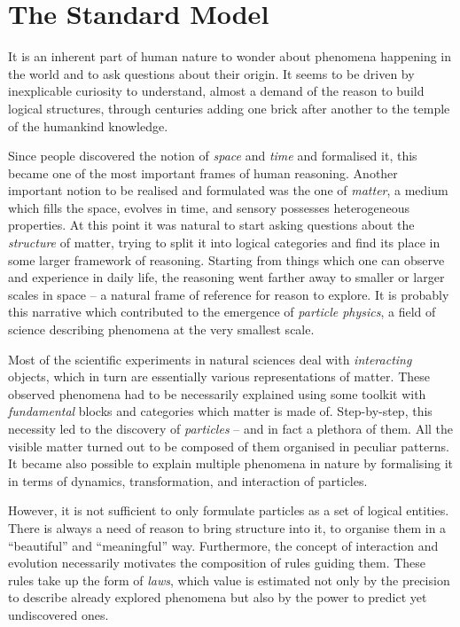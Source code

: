 \chapter{The Standard Model}\label{sec:sm}

It is an inherent part of human nature to wonder about phenomena happening in the world and to ask questions about their origin. It seems to be driven by inexplicable curiosity to understand, almost a demand of the reason to build logical structures, through centuries adding one brick after another to the temple of the humankind knowledge. 

Since people discovered the notion of \textit{space} and \textit{time} and formalised it, this became one of the most important frames of human reasoning. Another important notion to be realised and formulated was the one of \textit{matter}, a medium which fills the space, evolves in time, and sensory possesses heterogeneous properties. At this point it was natural to start asking questions about the \textit{structure} of matter, trying to split it into logical categories and find its place in some larger framework of reasoning. Starting from things which one can observe and experience in daily life, the reasoning went farther away to smaller or larger scales in space -- a natural frame of reference for reason to explore. It is probably this narrative which contributed to the emergence of \textit{particle physics}, a field of science describing phenomena at the very smallest scale. 

Most of the scientific experiments in natural sciences deal with \textit{interacting} objects, which in turn are essentially various representations of matter. These observed phenomena had to be necessarily explained using some toolkit with \textit{fundamental} blocks and categories which matter is made of. Step-by-step, this necessity led to the discovery of \textit{particles} -- and in fact a plethora of them. All the visible matter turned out to be composed of them organised in peculiar patterns. It became also possible to explain multiple phenomena in nature by formalising it in terms of dynamics, transformation, and interaction of particles. 

However, it is not sufficient to only formulate particles as a set of logical entities. There is always a need of reason to bring structure into it, to organise them in a \enquote{beautiful} and \enquote{meaningful} way. Furthermore, the concept of interaction and evolution necessarily motivates the composition of rules guiding them. These rules take up the form of \textit{laws}, which value is estimated not only by the precision to describe already explored phenomena but also by the power to predict yet undiscovered ones.

